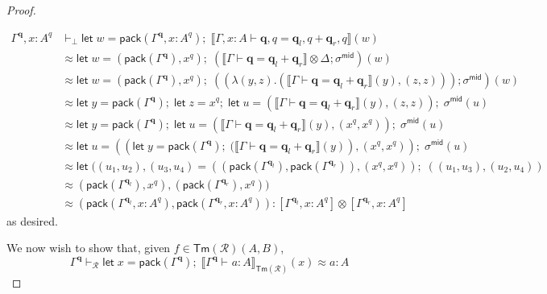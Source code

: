 \documentclass[acmsmall,screen,review]{acmart}
\newcommand{\mc}[1]{\ensuremath{\mathcal{#1}}}
\newcommand{\mb}[1]{\ensuremath{\mathbf{#1}}}
\newcommand{\ms}[1]{\ensuremath{\mathsf{#1}}}
\newcommand{\letexpr}[3]{\ensuremath{\ms{let}\;#1 = #2;\;#3}}
\newcommand{\qsp}[4]{#1 \vdash #2 = #3 + #4}
\newcommand{\hasty}[4]{#1 \vdash_{#2} #3: {#4}}
\newcommand{\teqv}{\approx}
\newcommand{\tmeq}[5]{#1 \vdash_{#2} #3 \teqv #4 : {#5}}
\newcommand{\dnt}[1]{\llbracket{#1}\rrbracket}
\newcommand{\dmor}[1]{{\Delta}_{#1}}
\begin{document}
\begin{proof}
\begin{itemize}
    \begin{align*}
      \Gamma^{\mb{q}}, x : A^q &\vdash_\bot
        \letexpr{w}{\ms{pack}(\Gamma^{\mb{q}}, x : A^q)}
          {\dnt{\qsp{\Gamma, x : A}{\mb{q}, q}{\mb{q}_l, q}{\mb{q}_r, q}}(w)} \\
        &\approx
        \letexpr{w}{(\ms{pack}(\Gamma^{\mb{q}}), x^q)}{
          (\dnt{\qsp{\Gamma}{\mb{q}}{\mb{q}_l}{\mb{q}_r}} \otimes \dmor{}
            ; \sigma^{\ms{mid}})(w)
        } \\
        &\approx
        \letexpr{w}{(\ms{pack}(\Gamma^{\mb{q}}), x^q)}{
          ((\lambda (y, z) . (\dnt{\qsp{\Gamma}{\mb{q}}{\mb{q}_l}{\mb{q}_r}}(y), (z, z))) 
            ; \sigma^{\ms{mid}})(w)
        } \\
        &\approx
        \letexpr{y}{\ms{pack}(\Gamma^{\mb{q}})}{
          \letexpr{z}{x^q}{
            \letexpr{u}{(\dnt{\qsp{\Gamma}{\mb{q}}{\mb{q}_l}{\mb{q}_r}}(y), (z, z))}
              {\sigma^{\ms{mid}}(u)}
          }
        }
        \\
        &\approx
        \letexpr{y}{\ms{pack}(\Gamma^{\mb{q}})}{
          \letexpr{u}{(\dnt{\qsp{\Gamma}{\mb{q}}{\mb{q}_l}{\mb{q}_r}}(y), (x^q, x^q))}
            {\sigma^{\ms{mid}}(u)}
        }
        \\
        &\approx
        \letexpr{u}{
          ((\letexpr{y}{\ms{pack}(\Gamma^{\mb{q}})}
            {(\dnt{\qsp{\Gamma}{\mb{q}}{\mb{q}_l}{\mb{q}_r}}(y)}), (x^q, x^q))
          }
          {\sigma^{\ms{mid}}(u)}
        \\
        &\approx
        \letexpr{((u_1, u_2), (u_3, u_4)}{
          ((\ms{pack}(\Gamma^{\mb{q}_l}), \ms{pack}(\Gamma^{\mb{q}_r})), (x^q, x^q))
          }
          {((u_1, u_3), (u_2, u_4))}
        \\
        &\approx
          (\ms{pack}(\Gamma^{\mb{q}_l}), x^q), (\ms{pack}(\Gamma^{\mb{q}_r}), x^q))
        \\
        &\approx
          (\ms{pack}(\Gamma^{\mb{q}_l}, x : A^q), \ms{pack}(\Gamma^{\mb{q}_r}, x : A^q))
        : [\Gamma^{\mb{q}_l}, x : A^q] \otimes [\Gamma^{\mb{q}_r}, x : A^q]
    \end{align*}
    as desired.
  \end{itemize}
  We now wish to show that, given $f \in \ms{Tm}(\mc{R})(A, B)$,
  \begin{equation*}
    \tmeq{\Gamma^{\mb{q}}}{\mc{R
    }}{\letexpr{x}{\ms{pack}(\Gamma^{\mb{q}})}
                  {\dnt{\hasty{\Gamma^{\mb{q}}}{}{a}{A}}_{\ms{Tm}(\mc{R})}(x)}}{a}{A}
  \end{equation*}

\end{proof}
\end{document}

